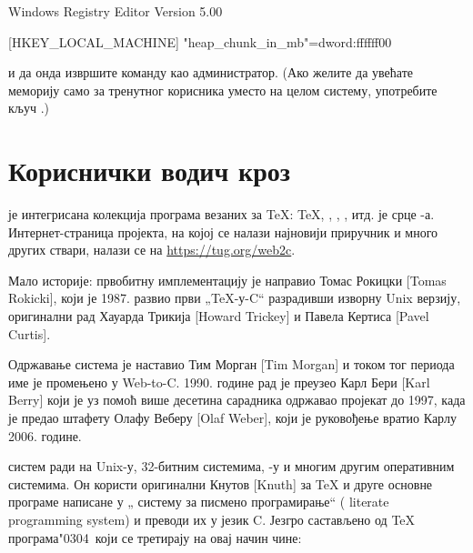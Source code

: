 \documentclass{article}
\begin{document}
\begin{sverbatim}
Windows Registry Editor Version 5.00

[HKEY_LOCAL_MACHINE\Software\Cygwin]
"heap_chunk_in_mb"=dword:ffffff00
\end{sverbatim}

\noindent и да онда извршите команду 
као администратор. (Ако желите да увећате меморију само за тренутног
корисника уместо на целом систему, употребите кључ
.)


\section{Кориснички водич кроз \Webc{}}

\Webc{} је интегрисана колекција програма везаних за \TeX:
 \TeX{}, \MF{}, \MP, \BibTeX{}, итд. \Webc{} је срце
\TL{}-а. Интернет-страница пројекта, на којој се налази најновији
приручник и много других ствари, налази се на
\url{https://tug.org/web2c}.

Мало историје: првобитну имплементацију је направио Томас Рокицки
[\textgerman{Tomas Rokicki}], који је 1987. развио први „\TeX{}-у-C“
разрадивши изворну Unix верзију, оригинални рад Хауарда Трикија
[\textenglish{Howard Trickey}] и Павела Кертиса [\textenglish{Pavel
Curtis}].

Одржавање система је наставио Тим Морган [\textenglish{Tim
Morgan}] и током тог периода име је промењено у Web-to-C\@. 1990.
године рад је преузео Карл Бери [\textenglish{Karl Berry}] који је уз
помоћ више десетина сарадника одржавао пројекат до 1997, када је
предао штафету Олафу Веберу [\textenglish{Olaf Weber}], који је
руковођење вратио Карлу 2006. године.

\Webc{} систем ради на Unix-у, 32-битним \Windows{} системима,
\MacOSX{}-у и многим другим оперативним системима. Он користи
оригинални Кнутов [\textenglish{Knuth}]  за \TeX{} и
друге основне програме написане у „\web{} систему за писмено
програмирање“ (\web{} literate programming system) и преводи их у
језик C. Језгро састављено од \TeX{} програма\char"0304\ који се
третирају на овај начин чине:
\end{document}
